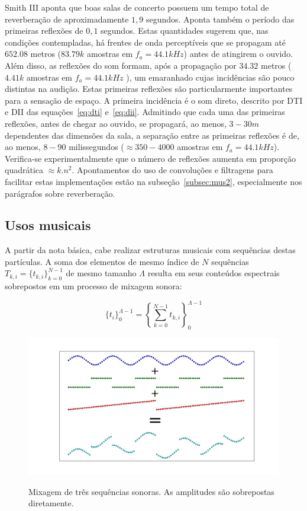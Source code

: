 Smith III aponta que boas salas de concerto possuem um tempo total de reverberação de aproximadamente $1,9$ segundos. Aponta também o período das primeiras reflexões de $0,1$ segundos. Estas quantidades sugerem que, nas condições contempladas, há frentes de onda perceptíveis que se propagam até $652.08$ metros ($83.79k$ amostras em $f_a=44.1kHz$) antes de atingirem o ouvido. Além disso, as reflexões do som formam, após a propagação por $34.32$ metros ($4.41k$ amostras em $f_a=44.1kHz$ ), um emaranhado cujas incidências são pouco distintas na audição. Estas primeiras reflexões são particularmente importantes para a sensação de espaço. A primeira incidência é o som direto, descrito por DTI e DII das equações~\ref{eq:dti} e~\ref{eq:dii}. Admitindo que cada uma das primeiras reflexões, antes de chegar ao ouvido, se propagará, ao menos, $3-30m$ dependentes das dimensões da sala, a separação entre as primeiras reflexões é de, ao menos, $8-90$ milissegundos ($\approx 350-4000$ amostras em $f_a=44.1kHz$). Verifica-se experimentalmente que o número de reflexões aumenta em proporção quadrática  $ \approx k.n^2$. Apontamentos do uso de convoluções e filtragens para facilitar estas implementações estão na subseção~\ref{subsec:mus2}, especialmente nos parágrafos sobre reverberação.

\subsection{Usos musicais}\label{subsec:basMus}


A partir da nota básica, cabe realizar estruturas musicais com
sequências destas partículas. A soma dos elementos de mesmo índice de $N$ sequências $T_{k,i}=\{t_{k,i}\}_{k=0}^{N-1}$ de mesmo tamanho $\Lambda$ resulta em seus conteúdos espectrais sobrepostos em um processo de mixagem sonora:

\begin{equation}\label{eq:mixagem}
\{t_i\}_0^{\Lambda-1}=\left \{ \sum_{k=0}^{N-1}t_{k,i} \right \}_0^{\Lambda-1}
\end{equation}

\begin{figure}[h!]
    {\centering
        \includegraphics[width=\textwidth]{figuras/mixagem}}
    \caption{Mixagem de três sequências sonoras. As amplitudes são sobrepostas diretamente.}

        \label{fig:mixagem}
\end{figure}


